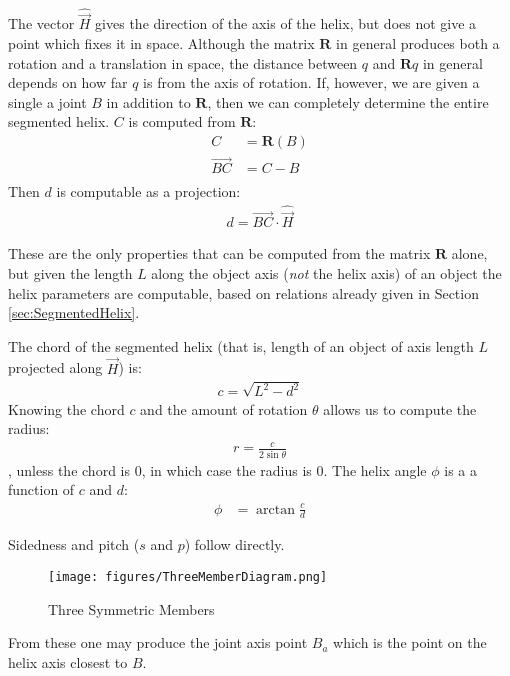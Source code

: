 \documentclass[11pt]{article}
\begin{document}
{The vector $\hat{\overrightarrow{H}}$ gives the direction of the
axis of the helix, but does not give a point which fixes
it in space.
Although the matrix $\bm{R}$ in general produces both a rotation
and a translation in space, the distance between $q$ and $\bm{R}q$
in general depends on how far $q$ is from the axis of rotation.
If, however, we are given a single a joint $B$ in addition to
$\bm{R}$, then we can completely determine the entire segmented helix.
$C$ is computed from $\bm{R}$:
\begin{align}
  C &= \bm{R}(B) \\
  \overrightarrow{BC} &= C - B\\
\end{align}
Then $d$ is computable as a projection:
\begin{align}
  d = \overrightarrow{BC} \cdot \hat{\overrightarrow{H}}
\end{align}

These are the only properties that can be computed from the
matrix $\bm{R}$ alone, but given the length $L$ along the
object axis ({\em not} the helix axis) of an object
the helix parameters are computable, based on relations
already given in Section \ref{sec:SegmentedHelix}.

The chord of the segmented helix (that is, length of an object of
axis length $L$
projected along $\overrightarrow{H}$) is:
\begin{align}
  c = \sqrt{L^2 - d^2}
\end{align}
Knowing the chord $c$ and the amount of rotation $\theta$
allows us to compute the radius:
\begin{align}
  r = \frac{c}{2 \sin{\theta}}
\end{align},
unless the chord is $0$, in which case the radius is $0$.
The helix angle $\phi$ is a a function of $c$ and $d$:
\begin{align}
    \phi &= \arctan{\frac{c}{d}}
\end{align}

Sidedness and pitch ($s$ and $p$) follow directly.


\begin{figure}
     \centering
     \texttt{[image: figures/ThreeMemberDiagram.png]}
     \caption{Three Symmetric Members}
  \label{fig:threemembersdiagram}
\end{figure}

From these one may produce the joint axis point $B_a$ which is the
point on the helix axis closest to $B$.

}
\end{document}
